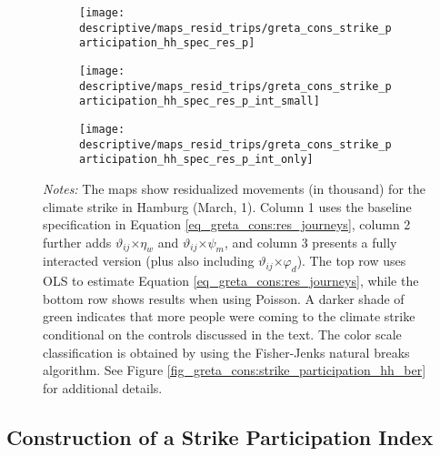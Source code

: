 {\begin{landscape}
\begin{figure}[H]
			\begin{subfigure}[h]{0.22\linewidth}\centering
				\texttt{[image: descriptive/maps\_resid\_trips/greta\_cons\_strike\_participation\_hh\_spec\_res\_p]}
			\end{subfigure}
			\begin{subfigure}[h]{0.22\linewidth}\centering
				\texttt{[image: descriptive/maps\_resid\_trips/greta\_cons\_strike\_participation\_hh\_spec\_res\_p\_int\_small]}
			\end{subfigure}
			\begin{subfigure}[h]{0.22\linewidth}\centering
				\texttt{[image: descriptive/maps\_resid\_trips/greta\_cons\_strike\_participation\_hh\_spec\_res\_p\_int\_only]}
			\end{subfigure}
			\begin{minipage}{0.9\linewidth}
				\scriptsize{\emph{Notes:} The maps show residualized movements (in thousand) for the climate strike in Hamburg (March, 1). Column 1 uses the baseline specification in Equation \ref{eq_greta_cons:res_journeys}, column 2 further adds $\vartheta_{ij}$$\times\eta_w$ and  $\vartheta_{ij}$$\times\psi_m$, and column 3 presents a fully interacted version (plus also including $\vartheta_{ij}$$\times\varphi_d$). The top row uses OLS to estimate Equation \ref{eq_greta_cons:res_journeys}, while the bottom row shows results when using Poisson. A darker shade of green indicates that more people were coming to the climate strike conditional on the controls discussed in the text. The color scale classification is obtained by using the Fisher-Jenks natural breaks algorithm. See Figure \ref{fig_greta_cons:strike_participation_hh_ber} for additional details.}
			\end{minipage}
		\end{figure}
		\vspace*{\fill}\clearpage
	\end{landscape}
	\restoregeometry
}







\subsection{Construction of a Strike Participation Index}

